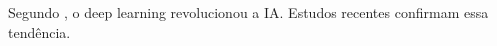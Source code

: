 
% 

Segundo \citet{Goodfellow2016}, o deep learning revolucionou a IA.
Estudos recentes \citep{Smith2023, Jones2024} confirmam essa tendência.









